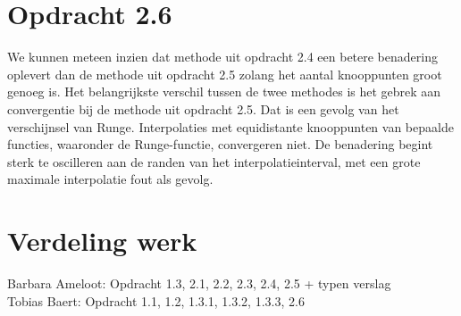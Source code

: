 \documentclass[a4paper]{article}
\begin{document}
\section*{Opdracht 2.6}
We kunnen meteen inzien dat methode uit opdracht 2.4 een betere benadering oplevert dan de  methode uit opdracht 2.5 zolang het aantal knooppunten groot genoeg is. Het belangrijkste verschil tussen de twee methodes is het gebrek aan convergentie bij de methode uit opdracht 2.5. Dat is een gevolg van het verschijnsel van Runge. Interpolaties met equidistante knooppunten van bepaalde functies, waaronder de Runge-functie, convergeren niet. De benadering begint sterk te oscilleren aan de randen van het interpolatieinterval, met een grote maximale interpolatie fout als gevolg.
\section*{Verdeling werk}
Barbara Ameloot: Opdracht 1.3, 2.1, 2.2, 2.3, 2.4, 2.5 + typen verslag
\\Tobias Baert: Opdracht 1.1, 1.2, 1.3.1, 1.3.2, 1.3.3, 2.6
\end{document}
